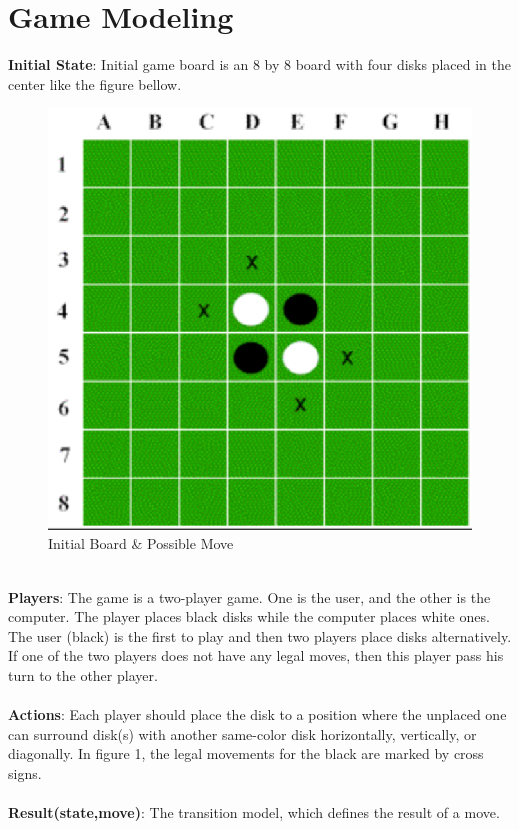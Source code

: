 \documentclass[letterpaper,12pt]{article}
\begin{document}
\section{Game Modeling}
\textbf{Initial State}: Initial game board is an 8 by 8 board with four disks placed in the center like the figure bellow.
\begin{figure}[!htb]
\centering
\includegraphics[scale=.6]{initial.eps}
\caption{Initial Board \& Possible Move}
\label{fig:digraph}
\end{figure}
\\
\noindent
\textbf{Players}: The game is a two-player game. One is the user, and the other is the computer. The player places black disks while the computer places white ones. The user (black) is the first to play and then two players place disks alternatively. If one of the two players does not have any legal moves, then this player pass his turn to the other player.
\\\\
\textbf{Actions}: Each player should place the disk to a position where the unplaced one can surround disk(s) with another same-color disk horizontally, vertically, or diagonally. In figure 1, the legal movements for the black are marked by cross signs.
\\\\
\textbf{Result(state,move)}: The transition model, which defines the result of a move.
\end{document}
